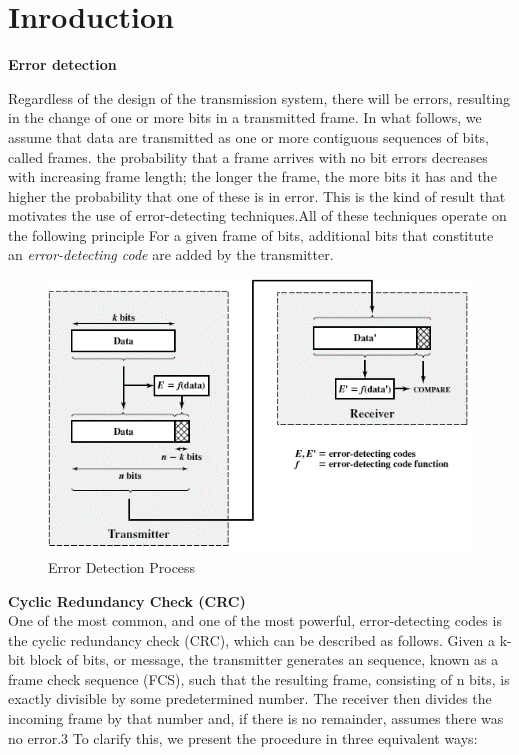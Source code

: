 \section{Inroduction}

\textbf{Error detection}

Regardless of the design of the transmission system, there will be errors, resulting
in the change of one or more bits in a transmitted frame. In what follows, we assume that data are transmitted as one or more contiguous sequences of bits,
called frames. 
the probability that a frame arrives with no bit
errors decreases with increasing frame length; the longer the frame, the more bits it
has and the higher the probability that one of these is in error. This is the kind of result that motivates the use of error-detecting techniques.All
of these techniques operate on the following principle  For a given frame
of bits, additional bits that constitute an \emph{error-detecting code} are added by the transmitter.

\begin{figure}[!htbp]
	\centering
	\includegraphics [scale=0.55]{images/Intro/Imagen1.png}
	\caption{Error Detection Process}
\end{figure}



\textbf{Cyclic Redundancy Check (CRC)}\\

One of the most common, and one of the most powerful, error-detecting codes is the
cyclic redundancy check (CRC), which can be described as follows. Given a k-bit
block of bits, or message, the transmitter generates an sequence, known
as a frame check sequence (FCS), such that the resulting frame, consisting of n bits,
is exactly divisible by some predetermined number. The receiver then divides the
incoming frame by that number and, if there is no remainder, assumes there was no
error.3
To clarify this, we present the procedure in three equivalent ways:

